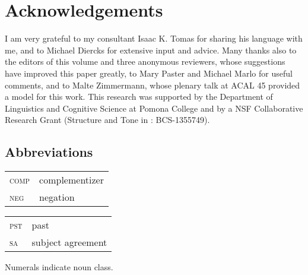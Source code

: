 \documentclass[output=paper]{langsci/langscibook}
\begin{document}
\section*{Acknowledgements}

I am very grateful to my  consultant Isaac K. Tomas for sharing his language with me, and to Michael Diercks for extensive input and advice. Many thanks also to the editors of this volume and three anonymous reviewers, whose suggestions have improved this paper greatly, to Mary Paster and Michael Marlo for useful comments, and to Malte Zimmermann, whose plenary talk at ACAL 45 provided a model for this work. This research was supported by the Department of Linguistics and Cognitive Science at Pomona College and by a NSF Collaborative Research Grant (Structure and Tone in : BCS-1355749).

\subsection*{Abbreviations}

\begin{tabularx}{.45\textwidth}{lX}
\textsc{comp} &  complementizer  \\
\textsc{neg} &  negation  
\end{tabularx}
\begin{tabularx}{.45\textwidth}{lX}
\textsc{pst} &  past \\
\textsc{sa}  & subject agreement\\
\end{tabularx}

\medskip
Numerals indicate  noun class.

\printbibliography[heading=subbibliography,notkeyword=this]
\end{document}
